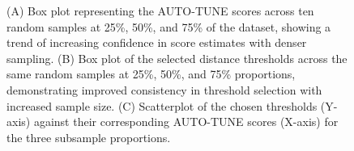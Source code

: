 \documentclass[utf8]{FrontiersinHarvard} %
\begin{document}


\begin{figure}[h!]
	\caption{ (A) Box plot representing the AUTO-TUNE scores across ten random
		samples at 25\%, 50\%, and 75\% of the \citep{rhee_national_2019} dataset,
		showing a trend of increasing confidence in score estimates with denser
		sampling. (B) Box plot of the selected distance thresholds across the same
		random samples at 25\%, 50\%, and 75\% proportions, demonstrating improved
		consistency in threshold selection with increased sample size. (C)
		Scatterplot of the chosen thresholds (Y-axis) against their corresponding
		AUTO-TUNE scores (X-axis) for the three subsample proportions.
	}\label{fig:subsampling}
\end{figure}
\end{document}
